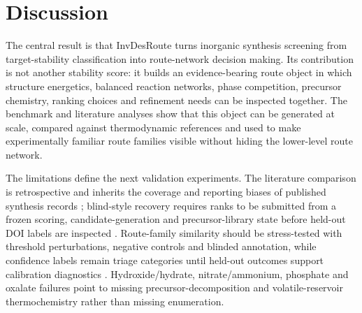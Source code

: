 \documentclass[11pt, letterpaper]{article}
\newcommand{\invdesroute}{InvDesRoute}
\begin{document}
\section*{Discussion}

The central result is that \invdesroute{} turns inorganic synthesis screening from target-stability classification into route-network decision making. Its contribution is not another stability score: it builds an evidence-bearing route object in which structure energetics, balanced reaction networks, phase competition, precursor chemistry, ranking choices and refinement needs can be inspected together. The benchmark and literature analyses show that this object can be generated at scale, compared against thermodynamic references and used to make experimentally familiar route families visible without hiding the lower-level route network.

The limitations define the next validation experiments. The literature comparison is retrospective and inherits the coverage and reporting biases of published synthesis records \cite{jia2019anthropogenic_biases}; blind-style recovery requires ranks to be submitted from a frozen scoring, candidate-generation and precursor-library state before held-out DOI labels are inspected \cite{kapoor2023leakage}. Route-family similarity should be stress-tested with threshold perturbations, negative controls and blinded annotation, while confidence labels remain triage categories until held-out outcomes support calibration diagnostics \cite{guo2017calibration,gneiting2007proper}. Hydroxide/hydrate, nitrate/ammonium, phosphate and oxalate failures point to missing precursor-decomposition and volatile-reservoir thermochemistry rather than missing enumeration.
\end{document}
